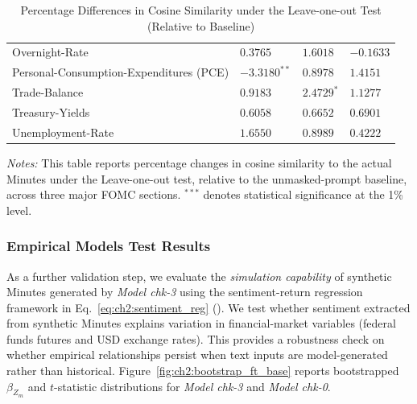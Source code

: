 \begin{table}[htbp]
\begin{threeparttable}
\begin{tabular}{p{3.6cm} p{4.3cm} p{3.1cm} p{3.1cm}}
Overnight-Rate & $0.3765$ & $1.6018$ & $-0.1633$ \\
Personal-Consumption-Expenditures (PCE) & $\mathbf{-3.3180^{**}}$ & $0.8978$ & $1.4151$ \\
Trade-Balance & $0.9183$ & $\mathbf{2.4729^{*}}$ & $1.1277$ \\
Treasury-Yields & $0.6058$ & $0.6652$ & $0.6901$ \\
Unemployment-Rate & $1.6550$ & $0.8989$ & $0.4222$ \\
\bottomrule
\end{tabular}
\begin{tablenotes}[flushleft]
\footnotesize
\item \textit{Notes:} This table reports percentage changes in cosine similarity to the actual Minutes under the Leave-one-out test, relative to the unmasked-prompt baseline, across three major FOMC sections. 
$^{***}$ denotes statistical significance at the 1\% level.
\end{tablenotes}
\caption{Percentage Differences in Cosine Similarity under the Leave-one-out Test (Relative to Baseline)}
\label{tab:ch2:shapley_diff_by_raw_result}
\end{threeparttable}
\end{table}








\subsubsection*{Empirical Models Test Results}

As a further validation step, we evaluate the \textit{simulation capability} of synthetic Minutes generated by \textit{Model chk-3} using the sentiment-return regression framework in Eq.~\ref{eq:ch2:sentiment_reg} (\citet{tadle2022fomc}). We test whether sentiment extracted from synthetic Minutes explains variation in financial-market variables (federal funds futures and USD exchange rates). This provides a robustness check on whether empirical relationships persist when text inputs are model-generated rather than historical. Figure~\ref{fig:ch2:bootstrap_ft_base} reports bootstrapped $\beta_{Z_m}$ and $t$-statistic distributions for \textit{Model chk-3} and \textit{Model chk-0}.


